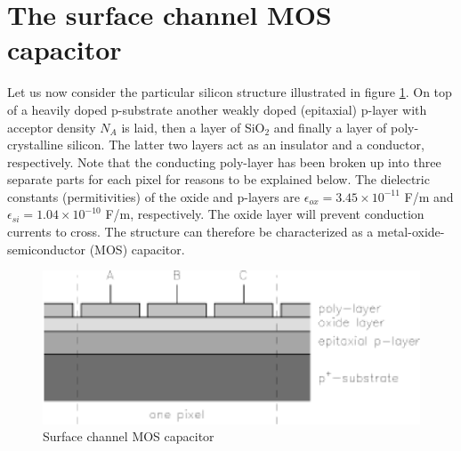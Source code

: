 \section{The surface channel MOS capacitor}

Let us now consider the particular silicon structure illustrated in
figure \ref{CCD.figpMOS}. On top of a heavily doped p-substrate
another weakly doped (epitaxial) p-layer with acceptor density $N_A$
is laid, then a layer of SiO$_2$ and finally a layer of
poly-crystalline silicon. The latter two layers act as an insulator and
a conductor, respectively. Note that the conducting poly-layer has
been broken up into three separate parts for each pixel for reasons to
be explained below. The dielectric constants (permitivities) of the
oxide and p-layers are $\epsilon_{ox} = 3.45 \times 10^{-11}$ F/m and
$\epsilon_{si} = 1.04\times 10^{-10}$ F/m, respectively.  The oxide
layer will prevent conduction currents to cross. The structure can
therefore be characterized as a metal-oxide-semiconductor (MOS)
capacitor.

\begin{figure}[h]
  \centering
	\includegraphics{CCD_pMOS.eps}
  \caption{Surface channel MOS capacitor}
  \label{CCD.figpMOS}
\end{figure}

